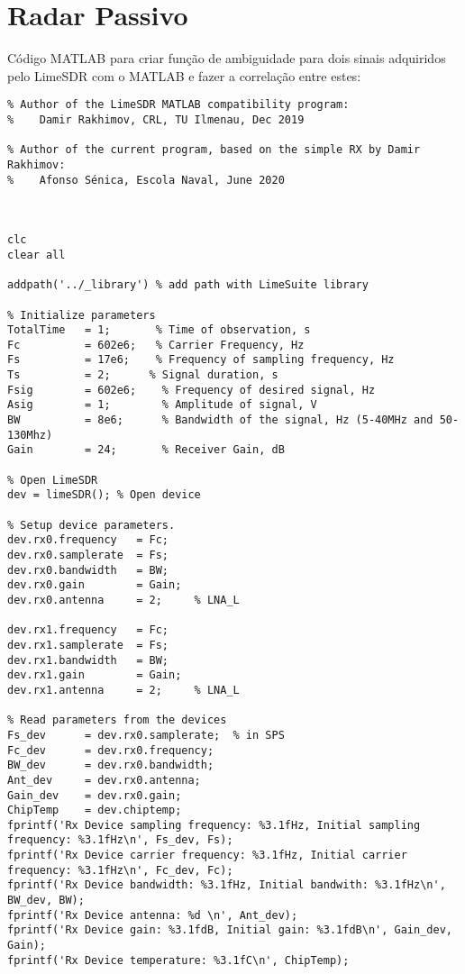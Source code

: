 
\chapter{Radar Passivo} %

\label{AppendixA} %


Código MATLAB para criar função de ambiguidade para dois sinais adquiridos pelo LimeSDR com o MATLAB e fazer a correlação entre estes:

\begin{verbatim}
% Author of the LimeSDR MATLAB compatibility program:
%    Damir Rakhimov, CRL, TU Ilmenau, Dec 2019

% Author of the current program, based on the simple RX by Damir Rakhimov:
%    Afonso Sénica, Escola Naval, June 2020



clc
clear all

addpath('../_library') % add path with LimeSuite library

% Initialize parameters
TotalTime   = 1;       % Time of observation, s
Fc          = 602e6;   % Carrier Frequency, Hz
Fs          = 17e6;    % Frequency of sampling frequency, Hz
Ts          = 2;      % Signal duration, s
Fsig        = 602e6;    % Frequency of desired signal, Hz
Asig        = 1;        % Amplitude of signal, V
BW          = 8e6;      % Bandwidth of the signal, Hz (5-40MHz and 50-130Mhz)
Gain        = 24;       % Receiver Gain, dB

% Open LimeSDR
dev = limeSDR(); % Open device

% Setup device parameters. 
dev.rx0.frequency   = Fc;
dev.rx0.samplerate  = Fs;
dev.rx0.bandwidth   = BW;
dev.rx0.gain        = Gain;
dev.rx0.antenna     = 2;     % LNA_L

dev.rx1.frequency   = Fc;
dev.rx1.samplerate  = Fs;
dev.rx1.bandwidth   = BW;
dev.rx1.gain        = Gain;
dev.rx1.antenna     = 2;     % LNA_L

% Read parameters from the devices
Fs_dev      = dev.rx0.samplerate;  % in SPS
Fc_dev      = dev.rx0.frequency;
BW_dev      = dev.rx0.bandwidth;
Ant_dev     = dev.rx0.antenna;
Gain_dev    = dev.rx0.gain;
ChipTemp    = dev.chiptemp;
fprintf('Rx Device sampling frequency: %3.1fHz, Initial sampling frequency: %3.1fHz\n', Fs_dev, Fs);
fprintf('Rx Device carrier frequency: %3.1fHz, Initial carrier frequency: %3.1fHz\n', Fc_dev, Fc);
fprintf('Rx Device bandwidth: %3.1fHz, Initial bandwith: %3.1fHz\n', BW_dev, BW);
fprintf('Rx Device antenna: %d \n', Ant_dev);
fprintf('Rx Device gain: %3.1fdB, Initial gain: %3.1fdB\n', Gain_dev, Gain);
fprintf('Rx Device temperature: %3.1fC\n', ChipTemp);


\end{verbatim}
